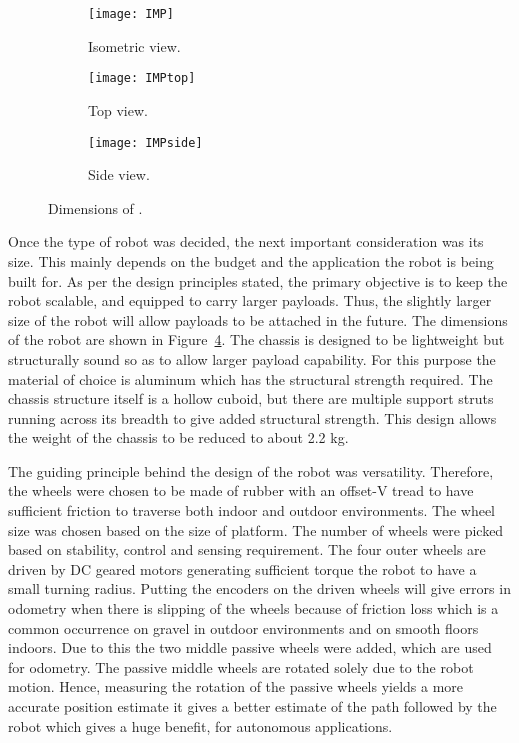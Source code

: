 \begin{figure}
    \centering
    \begin{subfigure}[b]{0.3\textwidth}
	    \texttt{[image: IMP]}
	    \caption{Isometric view.}
	    \label{fig:IMP}
    \end{subfigure}
    \quad %
    \begin{subfigure}[b]{0.3\textwidth}
        \texttt{[image: IMPtop]}
        \caption{Top view.}
        \label{fig:IMPtop}
    \end{subfigure}%
    \quad %
    \begin{subfigure}[b]{0.3\textwidth}
        \texttt{[image: IMPside]}
        \caption{Side view.}
        \label{fig:IMPside}
    \end{subfigure}%
    \caption{Dimensions of \imp.}
    \label{fig:IMPviews}
\end{figure}

Once the type of robot was decided, the next important consideration was its size. This mainly depends on the budget and the application the robot is being built for. As per the design principles stated, the primary objective is to keep the robot scalable, and equipped to carry larger payloads. Thus, the slightly larger size of the robot will allow payloads to be attached in the future. The dimensions of the robot are shown in Figure~\ref{fig:IMPviews}. The chassis is designed to be lightweight but structurally sound so as to allow larger payload capability. For this purpose the material of choice is aluminum which has the structural strength required. The chassis structure itself is a hollow cuboid, but there are multiple support struts running across its breadth to give added structural strength. This design allows the weight of the chassis to be reduced to about 2.2 kg.

The guiding principle behind the design of the robot was versatility. Therefore, the wheels were chosen to be made of rubber with an offset-V tread to have sufficient friction to traverse both indoor and outdoor environments. The wheel size was chosen based on the size of platform. The number of wheels were picked based on stability, control and sensing requirement. The four outer wheels are driven by DC geared motors generating sufficient torque the robot to have a small turning radius. Putting the encoders on the driven wheels will give errors in odometry when there is slipping of the wheels because of friction loss which is a common occurrence on gravel in outdoor environments and on smooth floors indoors. Due to this the two middle passive wheels were added, which are used for odometry. The passive middle wheels are rotated solely due to the robot motion. Hence, measuring the rotation of the passive wheels yields a more accurate position estimate it gives a better estimate of the path followed by the robot which gives a huge benefit, for autonomous applications. 

